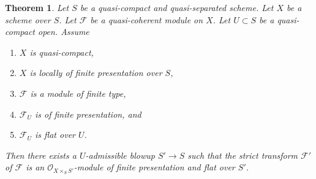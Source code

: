 \documentclass{amsart}
\theoremstyle{plain}
\newtheorem{theorem}[subsection]{Theorem}
\theoremstyle{definition}
\theoremstyle{remark}
\numberwithin{equation}{subsection}
\begin{document}
\begin{theorem}
\label{theorem-flatten-module}
Let $S$ be a quasi-compact and quasi-separated scheme.
Let $X$ be a scheme over $S$.
Let $\mathcal{F}$ be a quasi-coherent module on $X$.
Let $U \subset S$ be a quasi-compact open. Assume
\begin{enumerate}
\item $X$ is quasi-compact,
\item $X$ is locally of finite presentation over $S$,
\item $\mathcal{F}$ is a module of finite type,
\item $\mathcal{F}_U$ is of finite presentation, and
\item $\mathcal{F}_U$ is flat over $U$.
\end{enumerate}
Then there exists a $U$-admissible blowup $S' \to S$ such that the
strict transform $\mathcal{F}'$ of $\mathcal{F}$ is an
$\mathcal{O}_{X \times_S S'}$-module of finite presentation and
flat over $S'$.
\end{theorem}
\end{document}
